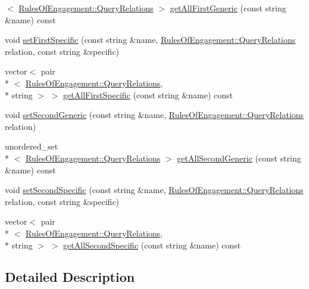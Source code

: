 \begin{DoxyCompactItemize}
$<$ \hyperlink{class_rules_of_engagement_a5e08db2a0638b98dbb06ad923a33d817}{Rules\-Of\-Engagement\-::\-Query\-Relations} $>$ \hyperlink{class_synonym_table_a6fd51931d0f5a80722fdd74dddbc6b68}{get\-All\-First\-Generic} (const string \&name) const 
\item 
void \hyperlink{class_synonym_table_a55b56ddfb36fe07ec341d470da958401}{set\-First\-Specific} (const string \&name, \hyperlink{class_rules_of_engagement_a5e08db2a0638b98dbb06ad923a33d817}{Rules\-Of\-Engagement\-::\-Query\-Relations} relation, const string \&specific)
\item 
vector$<$ pair\\*
$<$ \hyperlink{class_rules_of_engagement_a5e08db2a0638b98dbb06ad923a33d817}{Rules\-Of\-Engagement\-::\-Query\-Relations}, \\*
string $>$ $>$ \hyperlink{class_synonym_table_af223b1e48694ef48618a60753cf4d163}{get\-All\-First\-Specific} (const string \&name) const 
\item 
void \hyperlink{class_synonym_table_a163973b15f35deae030c1b194a06c1a2}{set\-Second\-Generic} (const string \&name, \hyperlink{class_rules_of_engagement_a5e08db2a0638b98dbb06ad923a33d817}{Rules\-Of\-Engagement\-::\-Query\-Relations} relation)
\item 
unordered\-\_\-set\\*
$<$ \hyperlink{class_rules_of_engagement_a5e08db2a0638b98dbb06ad923a33d817}{Rules\-Of\-Engagement\-::\-Query\-Relations} $>$ \hyperlink{class_synonym_table_aab6e5790402227ff0f28fe93fdc9d24f}{get\-All\-Second\-Generic} (const string \&name) const 
\item 
void \hyperlink{class_synonym_table_afd36238b0cd5ace74c15dfe30a302670}{set\-Second\-Specific} (const string \&name, \hyperlink{class_rules_of_engagement_a5e08db2a0638b98dbb06ad923a33d817}{Rules\-Of\-Engagement\-::\-Query\-Relations} relation, const string \&specific)
\item 
vector$<$ pair\\*
$<$ \hyperlink{class_rules_of_engagement_a5e08db2a0638b98dbb06ad923a33d817}{Rules\-Of\-Engagement\-::\-Query\-Relations}, \\*
string $>$ $>$ \hyperlink{class_synonym_table_a4e0c4cdc09a90edb32b1af4bc26172d6}{get\-All\-Second\-Specific} (const string \&name) const 
\end{DoxyCompactItemize}


\subsection{Detailed Description}


